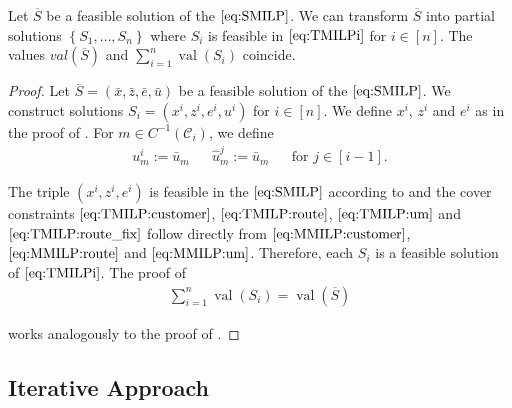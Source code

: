\begin{theorem}
\label{thm:equivalence_SMILP_TMILP}

Let $\overline{S}$ be a feasible solution of the $\eqref{eq:SMILP}$. We can transform $\overline{S}$ into partial solutions $\left\{S_1,\dots,S_n\right\}$ where $S_i$ is feasible in $\eqref{eq:TMILPi}$ for ${i\in[n]}$. The values ${val}(\overline{S})$ and ${\sum_{i=1}^n \operatorname{val}\left(S_i\right)}$ coincide.

\end{theorem}

\begin{proof}

Let ${\overline{S}=\left(\bar{x},\bar{z},\bar{e},\bar{u}\right)}$ be a feasible solution of the $\eqref{eq:SMILP}$. We construct solutions ${S_i=\left(x^i,z^i,e^i,u^i\right)}$ for ${i\in[n]}$. We define $x^i$, $z^i$ and $e^i$ as in the proof of . For ${m\in C^{-1}\left(\mathcal{C}_i\right)}$, we define
\begin{align*}
	u^i_m := \bar{u}_m && \hat{u}^j_m := \bar{u}_m && \text{for } j\in[i-1].
\end{align*}

The triple $\left(x^i,z^i,e^i\right)$ is feasible in the $\eqref{eq:SMILP}$ according to  and the cover constraints $\eqref{eq:TMILP:customer}$, $\eqref{eq:TMILP:route}$, $\eqref{eq:TMILP:um}$ and $\eqref{eq:TMILP:route_fix}$ follow directly from $\eqref{eq:MMILP:customer}$, $\eqref{eq:MMILP:route}$ and $\eqref{eq:MMILP:um}$. Therefore, each $S_i$ is a feasible solution of $\eqref{eq:TMILPi}$. The proof of
\begin{align*}
	\sum_{i=1}^n\operatorname{val}\left(S_i\right) = \operatorname{val}\left(\overline{S}\right)
\end{align*}

works analogously to the proof of .
%
\end{proof}


\subsection{Iterative Approach}
\label{sec:iterative_approach}

